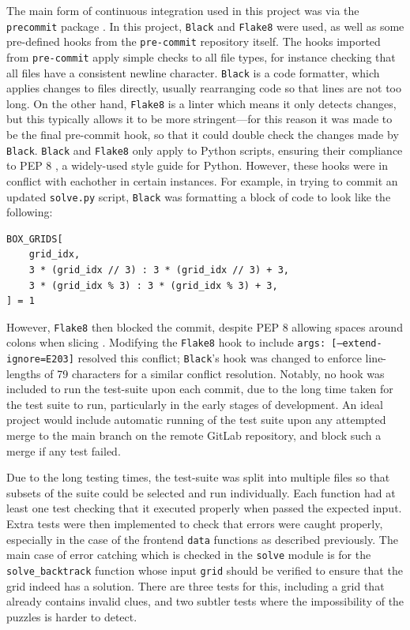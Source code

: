 \documentclass[12pt]{article}
\begin{document}
The main form of continuous integration used in this project was via the \texttt{pre\-commit} package \cite{precommit}.
In this project, \texttt{Black} \cite{black} and \texttt{Flake8} \cite{flake8} were used, as well as some pre-defined hooks from the \texttt{pre-commit} repository itself.
The hooks imported from \texttt{pre-commit} apply simple checks to all file types, for instance checking that all files have a consistent newline character.
\texttt{Black} is a code formatter, which applies changes to files directly, usually rearranging code so that lines are not too long.
On the other hand, \texttt{Flake8} is a linter which means it only detects changes, but this typically allows it to be more stringent---for this reason it was made to be the final pre-commit hook, so that it could double check the changes made by \texttt{Black}.
\texttt{Black} and \texttt{Flake8} only apply to Python scripts, ensuring their compliance to PEP 8 \cite{pep8}, a widely-used style guide for Python.
However, these hooks were in conflict with eachother in certain instances.
For example, in trying to commit an updated \texttt{solve.py} script, \texttt{Black} was formatting a block of code to look like the following:
\begin{lstlisting}
BOX_GRIDS[
    grid_idx,
    3 * (grid_idx // 3) : 3 * (grid_idx // 3) + 3,
    3 * (grid_idx % 3) : 3 * (grid_idx % 3) + 3,
] = 1
\end{lstlisting}
However, \texttt{Flake8} then blocked the commit, despite PEP 8 allowing spaces around colons when slicing \cite{pep8}.
Modifying the \texttt{Flake8} hook to include \texttt{args: [--extend-ignore=E203]} resolved this conflict; \texttt{Black}'s hook was changed to enforce line-lengths of 79 characters for a similar conflict resolution.
Notably, no hook was included to run the test-suite upon each commit, due to the long time taken for the test suite to run, particularly in the early stages of development.
An ideal project would include automatic running of the test suite upon any attempted merge to the main branch on the remote GitLab repository, and block such a merge if any test failed.

Due to the long testing times, the test-suite was split into multiple files so that subsets of the suite could be selected and run individually.
Each function had at least one test checking that it executed properly when passed the expected input.
Extra tests were then implemented to check that errors were caught properly, especially in the case of the frontend \texttt{data} functions as described previously.
The main case of error catching which is checked in the \texttt{solve} module is for the \texttt{solve\_backtrack} function whose input \texttt{grid} should be verified to ensure that the grid indeed has a solution.
There are three tests for this, including a grid that already contains invalid clues, and two subtler tests where the impossibility of the puzzles is harder to detect.
\end{document}
